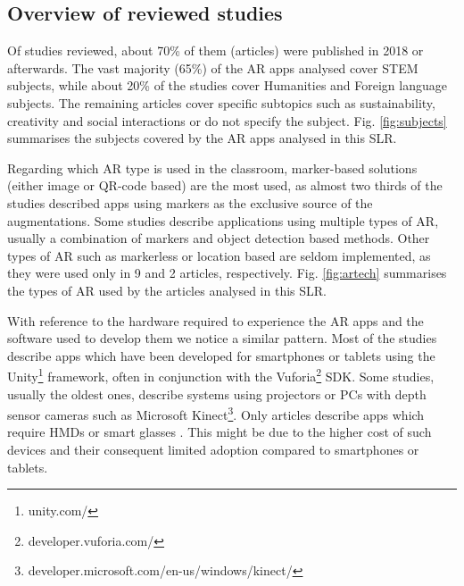 \subsection{Overview of reviewed studies}

Of \papersSelected studies reviewed, about 70\% of them (\papersAfterTwentyEighteen articles) were published in 2018 or afterwards. The vast majority (65\%) of the AR apps analysed cover STEM subjects, while about 20\% of the studies cover Humanities and Foreign language subjects. The remaining articles cover specific subtopics such as sustainability, creativity and social interactions or do not specify the subject. Fig. \ref{fig:subjects} summarises the subjects covered by the AR apps analysed in this \gls{SLR}.

% 	

Regarding which AR type is used in the classroom, marker-based solutions (either image or QR-code based) are the most used, as almost two thirds of the studies described apps using markers as the exclusive source of the augmentations. 
Some studies describe applications using multiple types of \gls{AR}, usually a combination of markers and object detection based methods. Other types of \gls{AR} such as markerless or location based are seldom implemented, as they were used only in 9 and 2 articles, respectively. Fig. \ref{fig:artech} summarises the types of AR used by the articles analysed in this \gls{SLR}.

% 	

With reference to the hardware required to experience the AR apps and the software used to develop them we notice a similar pattern. Most of the studies describe apps which have been developed for smartphones or tablets using the Unity\footnote{unity.com/} framework, often in conjunction with the Vuforia\footnote{developer.vuforia.com/} \gls{SDK}. Some studies, usually the oldest ones, describe systems using projectors or PCs with depth sensor cameras such as Microsoft Kinect\footnote{developer.microsoft.com/en-us/windows/kinect/}. Only \hardwareHMD articles describe apps which require \glspl{HMD} or smart glasses \citep{wei2018improving, oh2016designing, oh2017hybrid, kum2019ar, khan2018mathland, matsutomo2017computer}. This might be due to the higher cost of such devices and their consequent limited adoption compared to smartphones or tablets.

